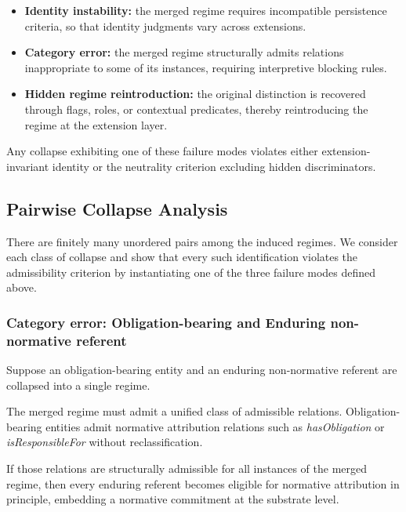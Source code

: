 \begin{itemize}
  \item \textbf{Identity instability:} the merged regime requires
        incompatible persistence criteria, so that identity judgments
        vary across extensions.
  \item \textbf{Category error:} the merged regime structurally admits
        relations inappropriate to some of its instances,
        requiring interpretive blocking rules.
  \item \textbf{Hidden regime reintroduction:} the original distinction
        is recovered through flags, roles, or contextual predicates,
        thereby reintroducing the regime at the extension layer.
\end{itemize}

Any collapse exhibiting one of these failure modes violates
either extension-invariant identity or the neutrality
criterion excluding hidden discriminators.

\subsection{Pairwise Collapse Analysis}
\label{sec:collapse_examples}

There are finitely many unordered pairs among the induced regimes.
We consider each class of collapse and show that
every such identification violates the admissibility criterion
by instantiating one of the three failure modes defined above.

\subsubsection{Category error: Obligation-bearing and Enduring non-normative referent}

Suppose an obligation-bearing entity and an enduring
non-normative referent are collapsed into a single regime.

The merged regime must admit a unified class of admissible relations.
Obligation-bearing entities admit normative attribution relations
such as \emph{hasObligation} or \emph{isResponsibleFor}
without reclassification.

If those relations are structurally admissible for all instances
of the merged regime, then every enduring referent becomes
eligible for normative attribution in principle,
embedding a normative commitment at the substrate level.

